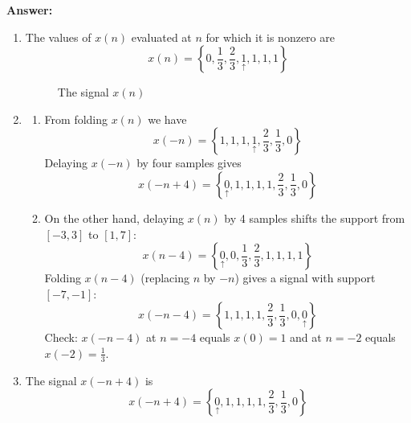 \documentclass[12pt,a4paper]{article}
\begin{document}
\noindent\textbf{Answer:}
\begin{enumerate}[label=\textbf{(\alph*)}, leftmargin=*]
    \item
    The values of $x(n)$ evaluated at $n$ for which it is nonzero are
    \[
    x(n)=\left\{0,\frac{1}{3},\frac{2}{3},\underset{\uparrow}{1},1,1,1 \right\}
    \]
    \begin{figure}[H]
        \centering
        \caption{The signal $x(n)$}
    \end{figure}
    \item 
    \begin{enumerate}[label=\arabic*.]
        \item 
        From folding $x(n)$ we have
        \[
        x(-n)=\left\{1,1,1,\underset{\uparrow}{1},\frac{2}{3},\frac{1}{3},0\right\}
        \]
        Delaying $x(-n)$ by four samples gives
        \[
        x(-n+4)=\left\{\underset{\uparrow}{0},1,1,1,1,\frac{2}{3},\frac{1}{3},0\right\}
        \]
        \item On the other hand, delaying $x(n)$ by 4 samples shifts the support from $[-3, 3]$ to $[1, 7]$:
        \[
        x(n-4)=\left\{\underset{\uparrow}{0},0,\frac{1}{3},\frac{2}{3},1,1,1,1\right\}
        \]
        Folding $x(n-4)$ (replacing $n$ by $-n$) gives a signal with support $[-7, -1]$:
        \[
        x(-n-4)=\left\{1,1,1,1,\frac{2}{3},\frac{1}{3},0,\underset{\uparrow}{0}\right\}
        \]
        Check: $x(-n-4)$ at $n=-4$ equals $x(0)=1$ and at $n=-2$ equals $x(-2)=\frac{1}{3}$.
    \end{enumerate}
    \item 
    The signal $x(-n+4)$ is
    \[
        x(-n+4)=\left\{\underset{\uparrow}{0},1,1,1,1,\frac{2}{3},\frac{1}{3},0\right\}
    \]
    \begin{figure}[H]
        \centering
\end{figure}
\end{enumerate}
\end{document}
